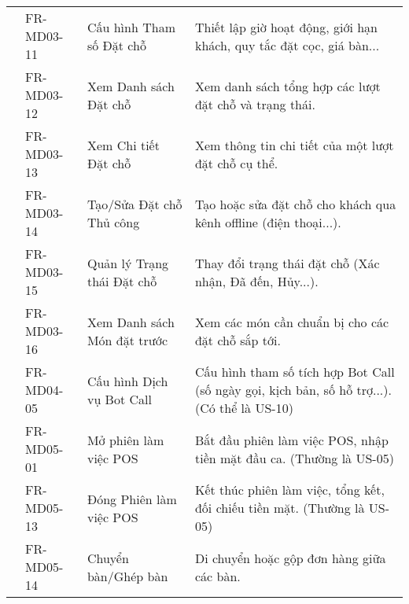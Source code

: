 \begin{longtable}{|m{2.5cm}|m{2.5cm}|m{5cm}|m{5cm}|}
	                                                        & FR-MD03-11            & Cấu hình Tham số Đặt chỗ                               & Thiết lập giờ hoạt động, giới hạn khách, quy tắc đặt cọc, giá bàn...                        \\
	                                                        & FR-MD03-12            & Xem Danh sách Đặt chỗ                                  & Xem danh sách tổng hợp các lượt đặt chỗ và trạng thái.                                      \\
	                                                        & FR-MD03-13            & Xem Chi tiết Đặt chỗ                                   & Xem thông tin chi tiết của một lượt đặt chỗ cụ thể.                                         \\
	                                                        & FR-MD03-14            & Tạo/Sửa Đặt chỗ Thủ công                               & Tạo hoặc sửa đặt chỗ cho khách qua kênh offline (điện thoại...).                            \\
	                                                        & FR-MD03-15            & Quản lý Trạng thái Đặt chỗ                             & Thay đổi trạng thái đặt chỗ (Xác nhận, Đã đến, Hủy...).                                     \\
	                                                        & FR-MD03-16            & Xem Danh sách Món đặt trước                            & Xem các món cần chuẩn bị cho các đặt chỗ sắp tới.                                           \\ \cline{2-4}
	                                                        & FR-MD04-05            & Cấu hình Dịch vụ Bot Call                              & Cấu hình tham số tích hợp Bot Call (số ngày gọi, kịch bản, số hỗ trợ...). (Có thể là US-10) \\ \cline{2-4}
	                                                        & FR-MD05-01            & Mở phiên làm việc POS                                  & Bắt đầu phiên làm việc POS, nhập tiền mặt đầu ca. (Thường là US-05)                         \\
	                                                        & FR-MD05-13            & Đóng Phiên làm việc POS                                & Kết thúc phiên làm việc, tổng kết, đối chiếu tiền mặt. (Thường là US-05)                    \\
	                                                        & FR-MD05-14            & Chuyển bàn/Ghép bàn                                    & Di chuyển hoặc gộp đơn hàng giữa các bàn.                                                   \\

\end{longtable}
